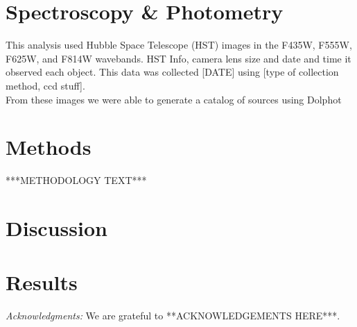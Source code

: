 \documentclass[preprint2]{aastex}
\begin{document}

\section{Spectroscopy \& Photometry}

This analysis used Hubble Space Telescope (HST) images in the
 F435W, F555W, F625W, and F814W wavebands. 
HST Info, camera lens size and date and time it observed each object.
This data was collected [DATE] using [type of collection method, ccd stuff]. \\
From these images we were able to generate a catalog of sources using 
Dolphot

\section{Methods}
***METHODOLOGY TEXT***

\section{Discussion}
\section{Results}

{\it Acknowledgments:} We are grateful to **ACKNOWLEDGEMENTS HERE***.

\end{document}
